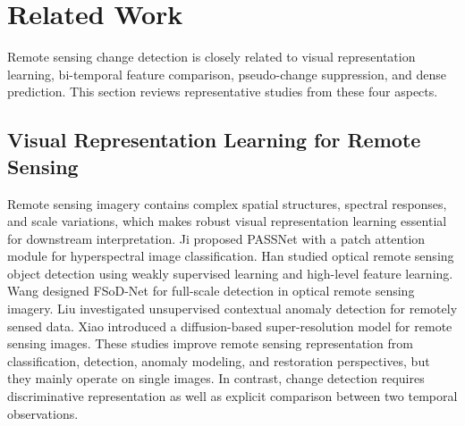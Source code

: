 \section{Related Work}\label{sec:RelatedWork}
    Remote sensing change detection is closely related to visual representation learning, bi-temporal feature comparison, pseudo-change suppression, and dense prediction. This section reviews representative studies from these four aspects.

    \subsection{Visual Representation Learning for Remote Sensing}\label{sec:RelatedWork:Vision}
        Remote sensing imagery contains complex spatial structures, spectral responses, and scale variations, which makes robust visual representation learning essential for downstream interpretation. Ji \etal proposed PASSNet\cite{passnet} with a patch attention module for hyperspectral image classification. Han \etal studied optical remote sensing object detection using weakly supervised learning and high-level feature learning\cite{weakly-supervised}. Wang \etal designed FSoD-Net\cite{Full-scale} for full-scale detection in optical remote sensing imagery. Liu \etal investigated unsupervised contextual anomaly detection for remotely sensed data\cite{unsupervised}. Xiao \etal introduced a diffusion-based super-resolution model for remote sensing images\cite{diffusion}. These studies improve remote sensing representation from classification, detection, anomaly modeling, and restoration perspectives, but they mainly operate on single images. In contrast, change detection requires discriminative representation as well as explicit comparison between two temporal observations.

